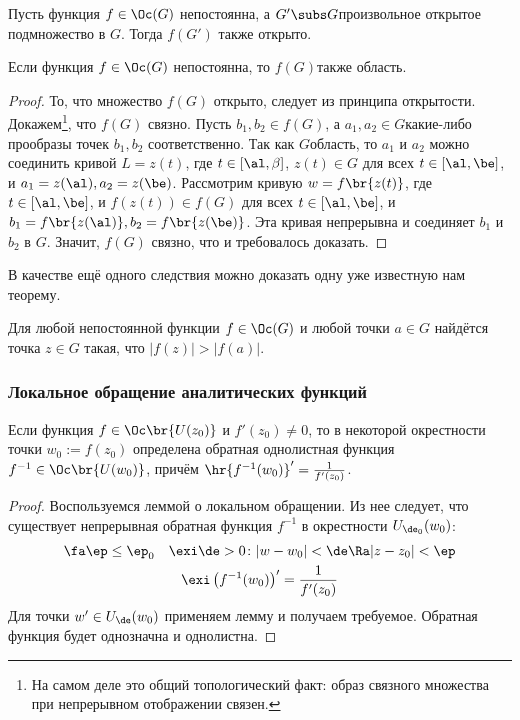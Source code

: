 \documentclass[a4paper]{article}
\begin{document}
\begin{theorem}
\begin{theorem}
Пусть функция $f\in \Oc(G)$ непостоянна, а $G'\subs G$\т произвольное открытое подмножество в $G$. Тогда $f(G')$ также открыто.
\end{theorem}
\begin{theorem}
Если функция $f \in \Oc(G)$ непостоянна, то $f(G)$\т также область.
\end{theorem}
\begin{proof}
То, что множество $f(G)$ открыто, следует из принципа открытости. Докажем\footnote{На самом деле это
общий топологический факт: образ связного множества при непрерывном отображении связен.}, что $f(G)$ связно. Пусть
$b_1, b_2 \in f(G)$, а $a_1,a_2\in G$\т какие-либо прообразы точек $b_1, b_2$ соответственно.
Так как $G$\т область, то $a_1$ и $a_2$ можно соединить кривой $L = z(t)$, где $t\in [\al,\beta]$,
$z(t)\in G$ для всех $t\in [\al, \be]$, и $a_1=z(\al), a_2=z(\be)$.
Рассмотрим кривую
$w=f\br{z(t)}$, где $t\in [\al,\be]$, и $f(z(t))\in f(G)$ для всех $t \in [\al, \be]$,
и $b_1=f\br{z(\al)}, b_2=f\br{z(\be)}$.
Эта кривая непрерывна и соединяет $b_1$ и $b_2$ в $G$. Значит, $f(G)$ связно, что и требовалось доказать.
\end{proof}

В качестве ещё одного следствия можно доказать одну уже известную нам теорему.
\begin{imp}
Для любой непостоянной функции $f\in\Oc(G)$ и любой точки $a\in G$ найдётся точка $z\in G$ такая, что $|f(z)|>|f(a)|$.
\end{imp}

\subsubsection{Локальное обращение аналитических функций}

\begin{theorem}\label{TheoremaOdin}
Если функция $f\in \Oc\br{U(z_0)}$ и $f'(z_0)\neq 0$, то в некоторой окрестности точки $w_0 := f(z_0)$
определена обратная однолистная функция $f^{-1} \in \Oc\br{U(w_0)}$, причём $\hr{f^{-1}(w_0)}'=\frac{1}{f'(z_0)}$.
\end{theorem}
\begin{proof}
Воспользуемся леммой о локальном обращении. Из нее следует, что существует
непрерывная обратная функция $f^{-1}$ в окрестности $U_{\de_0}(w_0)$:
\begin{gather*}
\fa \ep \le \ep_0 \quad \exi \de>0 \colon
|w-w_0|<\de \Ra |z-z_0|<\ep\\
\exi  \left( f^{-1}(w_0)\right)'=\frac{1}{f'(z_0)}
\end{gather*}
Для точки $w'\in U_\de(w_0)$ применяем лемму и
получаем требуемое. Обратная функция будет однозначна и однолистна.
\end{proof}


\end{theorem}
\end{document}
